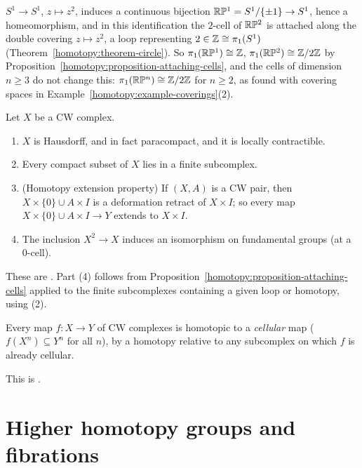 \begin{example}
\begin{enumerate}
$S^1 \to S^1$, $z \mapsto z^2$, induces a continuous bijection $\mathbb{R}\mathbb{P}^1 = S^1/\{\pm1\} \to S^1$, hence a homeomorphism, and in this identification the $2$-cell of
$\mathbb{R}\mathbb{P}^2$ is attached along the double covering $z \mapsto z^2$, a loop representing $2 \in \mathbb{Z} \cong \pi_1(S^1)$ (Theorem~\ref{homotopy:theorem-circle}). So
$\pi_1(\mathbb{R}\mathbb{P}^1) \cong \mathbb{Z}$, $\pi_1(\mathbb{R}\mathbb{P}^2) \cong \mathbb{Z}/2\mathbb{Z}$ by Proposition~\ref{homotopy:proposition-attaching-cells}, and the cells of dimension $n \geq 3$ do not
change this: $\pi_1(\mathbb{R}\mathbb{P}^n) \cong \mathbb{Z}/2\mathbb{Z}$ for $n \geq 2$, as found with covering spaces in Example~\ref{homotopy:example-coverings}(2).
\end{enumerate}
\end{example}

\begin{theorem}\label{homotopy:theorem-cw-properties}
Let $X$ be a CW complex.
\begin{enumerate}
\item $X$ is Hausdorff, and in fact paracompact, and it is locally contractible.
\item Every compact subset of $X$ lies in a finite subcomplex.
\item (Homotopy extension property) If $(X, A)$ is a CW pair, then $X \times \{0\} \cup A \times I$ is a deformation retract of $X \times I$; so every map
$X \times \{0\} \cup A \times I \to Y$ extends to $X \times I$.
\item The inclusion $X^2 \to X$ induces an isomorphism on fundamental groups (at a $0$-cell).
\end{enumerate}
\end{theorem}

These are \cite[Appendix, and Propositions 0.16 and 1.26]{hatcher-at}. Part (4) follows from Proposition~\ref{homotopy:proposition-attaching-cells}
applied to the finite subcomplexes containing a given loop or homotopy, using (2).

\begin{theorem}\label{homotopy:theorem-cellular-approximation}
Every map $f \colon X \to Y$ of CW complexes is homotopic to a \emph{cellular} map ($f(X^n) \subseteq Y^n$ for all $n$), by a homotopy relative to any subcomplex on which
$f$ is already cellular.
\end{theorem}

This is \cite[Theorem 4.8]{hatcher-at}.

\section{Higher homotopy groups and fibrations}\label{homotopy:section-higher}

